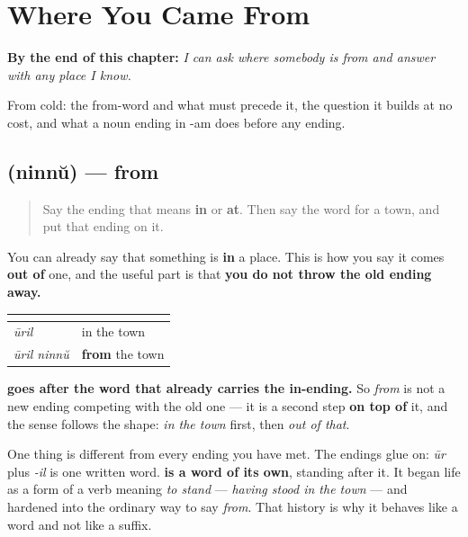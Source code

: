 
\chapter{Where You Came From}
\label{ch:ml-ablative}

\begin{chapteropening}
\textbf{By the end of this chapter:} \emph{I can ask where somebody is from and answer with any place I know.}

From cold: the from-word and what must precede it, the question it builds at no cost, and what a noun ending in -am does before any ending.
\end{chapteropening}

\section[\texorpdfstring{\ml{നിന്ന്} (ninnŭ)}{നിന്ന് (ninnŭ)}]{ (ninnŭ) — from}

\label{lesson:ML-C83-ninnu}



\begin{quote}
Say the ending that means \textbf{in} or \textbf{at}. Then say the word for a town, and put that ending on it.
\end{quote}

\begin{grammarlens}[title={Grammar Lens: from is built on in}]
You can already say that something is \textbf{in} a place. This is how you say it comes \textbf{out of} one, and the useful part is that \textbf{you do not throw the old ending away.}

\noindent
\begin{tabularx}{\linewidth}{@{}>{\raggedright\arraybackslash}X>{\raggedright\arraybackslash}X@{}}
\toprule
\textbf{} & \textbf{} \\
\midrule
\textbf{\ml{ഊരിൽ}} \emph{ūril} & in the town \\
\textbf{\ml{ഊരിൽ} \ml{നിന്ന്}} \emph{ūril ninnŭ} & \textbf{from} the town \\
\bottomrule
\end{tabularx}

\textbf{ goes after the word that already carries the in-ending.} So \emph{from} is not a new ending competing with the old one — it is a second step \textbf{on top of} it, and the sense follows the shape: \emph{in the town} first, then \emph{out of that}.

One thing is different from every ending you have met. The endings glue on: \emph{ūr} plus \emph{-il} is one written word. \textbf{ is a word of its own}, standing after it. It began life as a form of a verb meaning \emph{to stand} — \emph{having stood in the town} — and hardened into the ordinary way to say \emph{from}. That history is why it behaves like a word and not like a suffix.
\end{grammarlens}

